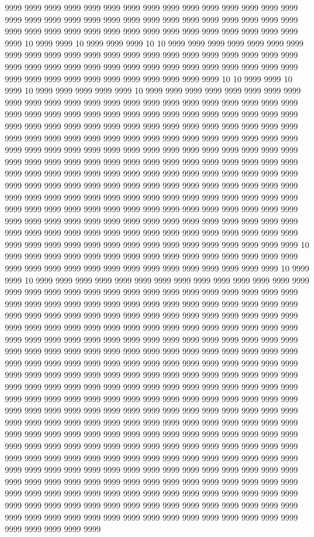 9999 9999 9999 9999 9999 9999 9999 9999 9999 9999 9999 9999 9999 9999 9999 9999 9999 9999 9999 9999 9999 9999 9999 9999 9999 9999 9999 9999 9999 9999 9999 9999 9999 9999 9999 9999 9999 9999 9999 9999 9999 9999 9999 9999 9999 9999 10 9999 9999 10 9999 9999 9999 10 10 9999 9999 9999 9999 9999 9999 9999 9999 9999 9999 9999 9999 9999 9999 9999 9999 9999 9999 9999 9999 9999 9999 9999 9999 9999 9999 9999 9999 9999 9999 9999 9999 9999 9999 9999 9999 9999 9999 9999 9999 9999 9999 9999 9999 9999 9999 9999 9999 10 10 9999 9999 10 9999 10 9999 9999 9999 9999 9999 10 9999 9999 9999 9999 9999 9999 9999 9999 9999 9999 9999 9999 9999 9999 9999 9999 9999 9999 9999 9999 9999 9999 9999 9999 9999 9999 9999 9999 9999 9999 9999 9999 9999 9999 9999 9999 9999 9999 9999 9999 9999 9999 9999 9999 9999 9999 9999 9999 9999 9999 9999 9999 9999 9999 9999 9999 9999 9999 9999 9999 9999 9999 9999 9999 9999 9999 9999 9999 9999 9999 9999 9999 9999 9999 9999 9999 9999 9999 9999 9999 9999 9999 9999 9999 9999 9999 9999 9999 9999 9999 9999 9999 9999 9999 9999 9999 9999 9999 9999 9999 9999 9999 9999 9999 9999 9999 9999 9999 9999 9999 9999 9999 9999 9999 9999 9999 9999 9999 9999 9999 9999 9999 9999 9999 9999 9999 9999 9999 9999 9999 9999 9999 9999 9999 9999 9999 9999 9999 9999 9999 9999 9999 9999 9999 9999 9999 9999 9999 9999 9999 9999 9999 9999 9999 9999 9999 9999 9999 9999 9999 9999 9999 9999 9999 9999 9999 9999 9999 9999 9999 9999 9999 9999 9999 9999 9999 9999 9999 9999 9999 9999 9999 9999 9999 9999 9999 9999 9999 9999 9999 9999 9999 9999 9999 9999 9999 9999 9999 9999 9999 9999 9999 9999 10 9999 9999 9999 9999 9999 9999 9999 9999 9999 9999 9999 9999 9999 9999 9999 9999 9999 9999 9999 9999 9999 9999 9999 9999 9999 9999 9999 9999 9999 10 9999 9999 10 9999 9999 9999 9999 9999 9999 9999 9999 9999 9999 9999 9999 9999 9999 9999 9999 9999 9999 9999 9999 9999 9999 9999 9999 9999 9999 9999 9999 9999 9999 9999 9999 9999 9999 9999 9999 9999 9999 9999 9999 9999 9999 9999 9999 9999 9999 9999 9999 9999 9999 9999 9999 9999 9999 9999 9999 9999 9999 9999 9999 9999 9999 9999 9999 9999 9999 9999 9999 9999 9999 9999 9999 9999 9999 9999 9999 9999 9999 9999 9999 9999 9999 9999 9999 9999 9999 9999 9999 9999 9999 9999 9999 9999 9999 9999 9999 9999 9999 9999 9999 9999 9999 9999 9999 9999 9999 9999 9999 9999 9999 9999 9999 9999 9999 9999 9999 9999 9999 9999 9999 9999 9999 9999 9999 9999 9999 9999 9999 9999 9999 9999 9999 9999 9999 9999 9999 9999 9999 9999 9999 9999 9999 9999 9999 9999 9999 9999 9999 9999 9999 9999 9999 9999 9999 9999 9999 9999 9999 9999 9999 9999 9999 9999 9999 9999 9999 9999 9999 9999 9999 9999 9999 9999 9999 9999 9999 9999 9999 9999 9999 9999 9999 9999 9999 9999 9999 9999 9999 9999 9999 9999 9999 9999 9999 9999 9999 9999 9999 9999 9999 9999 9999 9999 9999 9999 9999 9999 9999 9999 9999 9999 9999 9999 9999 9999 9999 9999 9999 9999 9999 9999 9999 9999 9999 9999 9999 9999 9999 9999 9999 9999 9999 9999 9999 9999 9999 9999 9999 9999 9999 9999 9999 9999 9999 9999 9999 9999 9999 9999 9999 9999 9999 9999 9999 9999 9999 9999 9999 9999 9999 9999 9999 9999 9999 9999 9999 9999 9999 9999 9999 9999 9999 9999 9999 9999 9999 9999 9999 9999 9999 9999 9999 9999 9999 9999 9999 9999 9999 9999 9999 9999 9999 9999 9999 9999 9999 9999 9999 9999 9999 9999 9999 9999 9999 9999 9999 9999 9999 9999 9999 9999 9999 9999 9999 9999 9999 9999 9999 9999 